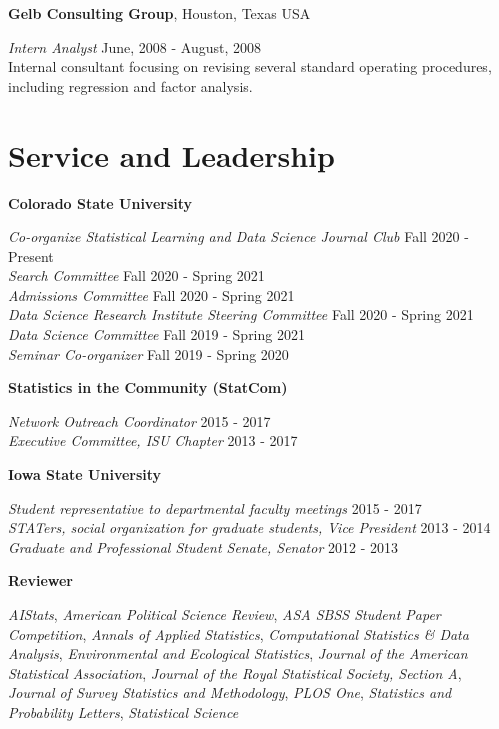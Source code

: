 \documentclass[margin,line]{res}
\begin{document}
\begin{resume}
{\bf Gelb Consulting Group}, Houston, Texas USA

\vspace{-.3cm}
{\em Intern Analyst} \hfill {June, 2008 - August, 2008}\\
Internal consultant focusing on revising several standard operating procedures, including regression and factor analysis. 

\section{\sc Service and Leadership}

{\bf Colorado State University}

\vspace{-.3cm}
{\em Co-organize Statistical Learning and Data Science Journal Club} \hfill {Fall 2020 - Present} \\
{\em Search Committee} \hfill {Fall 2020 - Spring 2021} \\
{\em Admissions Committee} \hfill {Fall 2020 - Spring 2021} \\
{\em Data Science Research Institute Steering Committee} \hfill {Fall 2020 - Spring 2021} \\
{\em Data Science Committee} \hfill {Fall 2019 - Spring 2021} \\
{\em Seminar Co-organizer} \hfill {Fall 2019 - Spring 2020}

{\bf Statistics in the Community (StatCom)}

\vspace{-.3cm}
{\em Network Outreach Coordinator} \hfill {2015 - 2017}\\
{\em Executive Committee, ISU Chapter} \hfill {2013 - 2017}

{\bf Iowa State University}

\vspace{-.3cm}
{\em Student representative to departmental faculty meetings} \hfill {2015 - 2017}\\
{\em STATers, social organization for graduate students, Vice President} \hfill {2013 - 2014}\\
{\em Graduate and Professional Student Senate, Senator} \hfill {2012 - 2013}


{\bf Reviewer}

\vspace{-.3cm}
{\em AIStats}, {\em American Political Science Review}, {\em ASA SBSS Student Paper Competition}, {\em Annals of Applied Statistics}, {\em Computational Statistics \& Data Analysis}, {\em Environmental and Ecological Statistics}, {\em Journal of the American Statistical Association}, {\em Journal of the Royal Statistical Society, Section A}, {\em Journal of Survey Statistics and Methodology}, {\em PLOS One}, {\em Statistics and Probability Letters}, {\em Statistical Science}\\


\end{resume}
\end{document}
